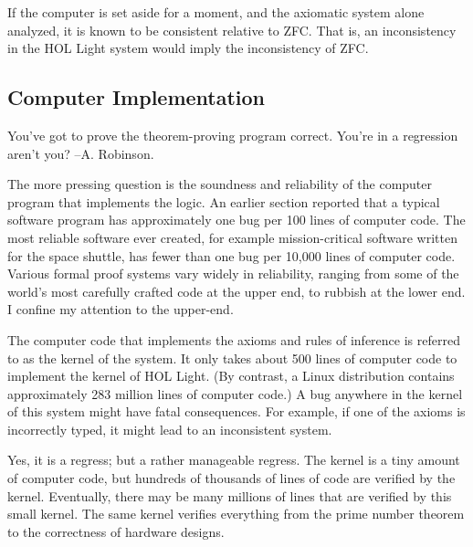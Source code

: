 \documentclass{llncs}
\begin{document}
If the computer is set aside for a moment, 
and the axiomatic system alone analyzed, it is known to be
consistent relative to ZFC.  That is, an inconsistency in
the HOL Light system would imply the inconsistency of ZFC. 



\subsection{Computer Implementation}

{\narrower\it  

You've got to prove the theorem-proving program correct. You're in a regression aren't you?
--A. Robinson.

}

\smallskip

The more pressing question is the soundness and reliability of the computer program that implements the
logic.  An earlier section reported that a typical software program has approximately one
bug per 100 lines of computer code.  The most reliable software ever created, for example
mission-critical software written for the space shuttle,
has fewer than one bug per 10,000 lines of computer
code.  Various formal proof systems vary widely in reliability, ranging
from some of the world's most carefully crafted code at the upper end, to
rubbish at the lower end.  I  confine my attention to the
upper-end.



The computer code that implements the axioms and rules of inference is referred to as the kernel of the system.
It only takes about
500 lines of computer code to implement the kernel of HOL Light.  
(By contrast, a Linux distribution contains approximately
283 million lines of computer code.)
A bug anywhere in the kernel of this system might have fatal consequences.  For example,
if one of the axioms  is incorrectly typed, it might lead to an inconsistent system.




Yes, it is a regress; but a rather manageable regress.  The kernel
is a tiny amount of computer code, but hundreds of thousands of lines of code  are
verified by the kernel.  Eventually, there may be many millions of lines that are
verified by this small kernel.  The same kernel verifies everything from
the prime number theorem to the correctness of hardware designs.
\end{document}
